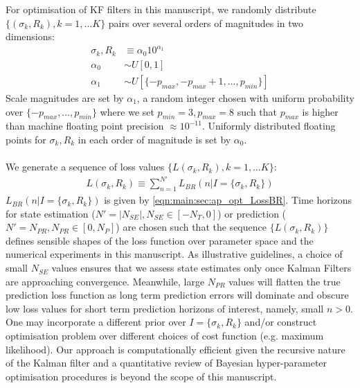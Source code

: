 \\  
\\
For optimisation of KF filters in this manuscript, we randomly distribute $\{(\sigma_{k}, R_{k}), k=1, \hdots K \}$ pairs over several orders of magnitudes in two dimensions:
\begin{align}
\sigma_k, R_k &\equiv \alpha_0 10^{\alpha_1} \\
\alpha_0 & \sim U[0, 1]\\
\alpha_1 & \sim U[\{ -p_{max}, -p_{max} + 1,  \hdots,  p_{min}\}]
\end{align}
Scale magnitudes are set by $\alpha_1$, a random integer chosen with uniform probability over $\{ -p_{max}, \hdots, p_{min} \}$ where we set $p_{min} = 3, p_{max} = 8$  such that $p_{max}$ is higher than machine floating point precision $\approx 10^{-11}$. Uniformly distributed floating points for $\sigma_k, R_k $ in each order of magnitude is set by $\alpha_0$. 
\\
\\
We generate a sequence of loss values $\{L(\sigma_k, R_k), k = 1, \hdots K\}$:
\begin{align}
L(\sigma_k, R_k) \equiv  \sum_{n=1}^{N'} L_{BR}(n | I= \{\sigma_k, R_k \})
\end{align}
$L_{BR}(n | I= \{\sigma_k, R_k \})$ is given by \cref{eqn:main:sec:ap_opt_LossBR}. Time horizons for state estimation ($N' = |N_{SE}| , N_{SE} \in  [-N_{T}, 0]$) or prediction ($N' = N_{PR}, N_{PR}  \in [0, N_{P}]$) are chosen such that the sequence $\{L(\sigma_k, R_k) \}$ defines sensible shapes of the loss function over parameter space and the numerical experiments in this manuscript. As illustrative guidelines, a choice of small $N_{SE}$ values ensures that we assess state estimates only once Kalman Filters are approaching convergence. Meanwhile, large $N_{PR}$ values will flatten the true prediction loss function as long term prediction errors will dominate and obscure low loss values for short term prediction horizons of interest, namely, small $n>0$. One may incorporate a different prior over $I= \{\sigma_k, R_k \}$ and/or construct optimisation problem over different choices of cost function (e.g. maximum likelihood). Our approach is computationally efficient given the recursive nature of the Kalman filter and a quantitative review of Bayesian hyper-parameter optimisation procedures is beyond the scope of this manuscript. 
\\
\\

